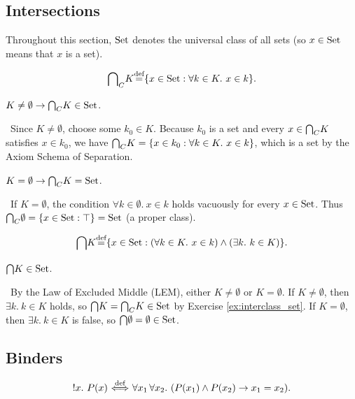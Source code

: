 \documentclass[10pt,a4paper]{article}
\begin{document}
\subsection{Intersections}
Throughout this section, ${\textrm{Set}}$ denotes the universal class of all sets (so $x \in {\textrm{Set}}$ means that $x$ is a set).

\begin{definition}
$${{\bigcap}_C} K {\stackrel{{\textrm{def}}}{=}} \{x \in {\textrm{Set}} : \forall k\in K.\ x\in k\}.$$
\end{definition}

\begin{exercise}\label{ex:interclass_set}
$K\neq \emptyset \to {{\bigcap}_C} K \in {\textrm{Set}}$.
\end{exercise}
\myprf\ Since $K \neq \emptyset$, choose some $k_0 \in K$. Because $k_0$ is a set and every $x \in {{\bigcap}_C} K$ satisfies $x \in k_0$, we have ${{\bigcap}_C} K = \{x \in k_0 : \forall k\in K.\ x\in k\}$, which is a set by the Axiom Schema of Separation. \myqed

\begin{exercise}
$K=\emptyset \to {{\bigcap}_C} K = {\textrm{Set}}$.
\end{exercise}
\myprf\ If $K = \emptyset$, the condition $\forall k \in \emptyset.\ x \in k$ holds vacuously for every $x \in {\textrm{Set}}$. Thus ${{\bigcap}_C} \emptyset = \{x \in {\textrm{Set}} : \top\} = {\textrm{Set}}$ (a proper class). \myqed

\begin{definition}
$${\bigcap} K {\stackrel{{\textrm{def}}}{=}} \{x \in {\textrm{Set}} : (\forall k\in K.\ x\in k)\land (\exists k.\ k\in K)\}.$$
\end{definition}

\begin{exercise}
${\bigcap} K \in {\textrm{Set}}$.
\end{exercise}
\myprf\ By the Law of Excluded Middle (LEM), either $K \neq \emptyset$ or $K = \emptyset$. If $K \neq \emptyset$, then $\exists k.\ k \in K$ holds, so ${\bigcap} K = {{\bigcap}_C} K \in {\textrm{Set}}$ by Exercise \ref{ex:interclass_set}. If $K = \emptyset$, then $\exists k.\ k \in K$ is false, so ${\bigcap} \emptyset = \emptyset \in {\textrm{Set}}$. \myqed

\subsection{Binders}
\begin{definition}\label{def:unique_q}
$$!x.\ P(x) \propdef \forall x_1\, \forall x_2.\ (P(x_1)\land P(x_2)\to x_1=x_2).$$
\end{definition}
\end{document}
